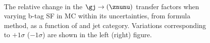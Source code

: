 \begin{figure}[!h]
  \centering
   ~~
  \\

  \caption{\label{fig:tfSyst_bsf_gjToZinv-formula} The relative change in the
  $\gj \rightarrow (\znunu)$ transfer
  factors when varying b-tag SF in MC within its uncertainties, from formula method, 
  as a function of \scalht and jet category. 
  Variations corresponding to $+1\sigma$ ($-1\sigma$) are shown in the left (right) figure. 
  }
\end{figure}

